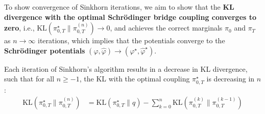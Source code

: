 \documentclass{article}
\begin{document}
To show convergence of Sinkhorn iterations, we aim to show that the \textbf{KL divergence with the optimal Schrödinger bridge coupling converges to zero}, i.e., $\text{KL}(\pi^\star_{0,T}\|\pi_{0,T}^{(n)})\to 0$, and achieves the correct marginals $\pi_0$ and $\pi_T$ as $n\to \infty$ iterations, which implies that the potentials converge to the \textbf{Schrödinger potentials} $(\varphi, \hat{\varphi})\to(\varphi^\star, \hat{\varphi}^\star)$. 

\begin{proposition}\label{prop:sinkhorn-marginal-convergence}
    Each iteration of Sinkhorn's algorithm results in a decrease in KL divergence, such that for all $n\geq -1$, the KL with the optimal coupling $\pi^\star_{0,T}$ is decreasing in $n$:
    \begin{align}
        \text{KL}\left(\pi^\star_{0,T}\|\pi^{(n)}_{0,T}\right)&=\text{KL}\left(\pi^\star_{0,T}\|q\right)-\sum_{k=0}^n\text{KL}\left(\pi^{(k)}_{0,T}\|\pi^{(k-1)}_{0,T}\right)\label{eq:sinkhorn-kl-decrease}
    \end{align}
\end{proposition}
\end{document}
